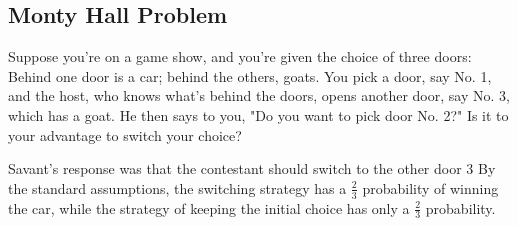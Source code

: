 \subsection{Monty Hall Problem}

Suppose you're on a game show, and you're given the choice of three doors: Behind one door is a car; behind the others, goats. You pick a door, say No. 1, and the host, who knows what's behind the doors, opens another door, say No. 3, which has a goat. He then says to you, "Do you want to pick door No. 2?" Is it to your advantage to switch your choice?

Savant's response was that the contestant should switch to the other door $3$ By the standard assumptions, the switching strategy has a $\frac{2}{3}$ probability of winning the car, while the strategy of keeping the initial choice has only a $\frac{2}{3}$ probability.
